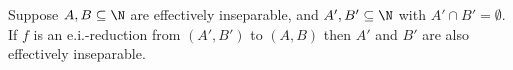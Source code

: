 \begin{proposition}\label{prop-reduction}
Suppose $A,B \subseteq \N$ are effectively inseparable, and 
 $A',B' \subseteq \N$ with $A' \cap B' = \emptyset$.  
If $f$ is an e.i.-reduction from $(A',B')$ to $(A,B)$ 
then $A'$ and $B'$ are also effectively inseparable.
\end{proposition}

